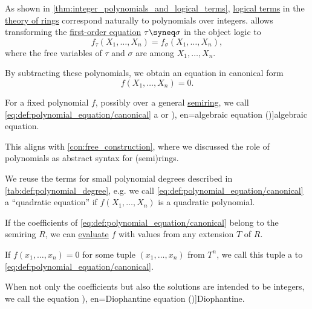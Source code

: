 \begin{definition}\label{def:polynomial_equation}\mimprovised
  As shown in \cref{thm:integer_polynomials_and_logical_terms}, \hyperref[def:fol_term]{logical terms} in the \hyperref[def:ring/theory]{theory of rings} correspond naturally to polynomials over integers.  allows transforming the \hyperref[def:fol_equation]{first-order equation} \( \tau \syneq \sigma \) in the object logic to
  \begin{equation}\label{eq:def:polynomial_equation/general}
    f_\tau(X_1, \ldots, X_n) = f_\sigma(X_1, \ldots, X_n),
  \end{equation}
  where the free variables of \( \tau \) and \( \sigma \) are among \( X_1, \ldots, X_n \).

  By subtracting these polynomials, we obtain an equation in canonical form
  \begin{equation}\label{eq:def:polynomial_equation/canonical}
    f(X_1, \ldots, X_n) = 0.
  \end{equation}

  For a fixed polynomial \( f \), possibly over a general \hyperref[def:semiring]{semiring}, we call \eqref{eq:def:polynomial_equation/canonical} a  or \term[bg=алгебрично уравнение (\cite[2]{Обрешков1962ВисшаАлгебра}), en=algebraic equation (\cite[15]{Kleene1971Metamathematics})]{algebraic equation}.

  This aligns with \cref{con:free_construction}, where we discussed the role of polynomials as abstract syntax for (semi)rings.

  We reuse the terms for small polynomial degrees described in \cref{tab:def:polynomial_degree}, e.g. we call \eqref{eq:def:polynomial_equation/canonical} a \enquote{quadratic equation} if \( f(X_1, \ldots, X_n) \) is a quadratic polynomial.

  \begin{thmenum}
     If the coefficients of \eqref{eq:def:polynomial_equation/canonical} belong to the semiring \( R \), we can \hyperref[con:free_construction/evaluation]{evaluate} \( f \) with values from any extension \( T \) of \( R \).

    If \( f(x_1, \ldots, x_n) = 0 \) for some tuple \( (x_1, \ldots, x_n) \) from \( T^n \), we call this tuple a  to \eqref{eq:def:polynomial_equation/canonical}.

     When not only the coefficients but also the solutions are intended to be integers, we call the equation \term[ru=Диофантово уравнение (\cite[\S 1.9]{ШеньВерещагин2017ВычислимыеФункции}), en=Diophantine equation (\cite[5]{Apostol1976AnalyticNumberTheory})]{Diophantine}.
  \end{thmenum}
\end{definition}

